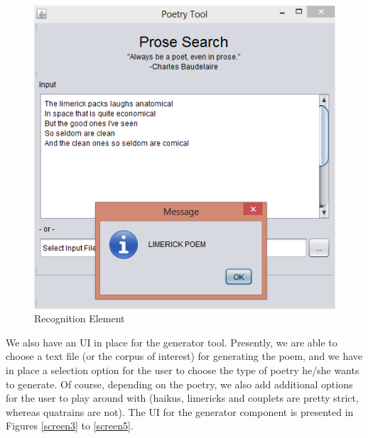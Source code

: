 \documentclass[10pt, letter]{article}
\begin{document}
\begin{figure}[ht]
  \centering
    \includegraphics[scale=0.5]{Images/screen2}
    \caption{Recognition Element}
  \label{screen2}
\end{figure}

We also have an UI in place for the generator tool. Presently, we are able to choose a text file (or the corpus of interest) for generating the poem, and we have in place a selection option for the user to choose the type of poetry he/she wants to generate. Of course, depending on the poetry, we also add additional options for the user to play around with (haikus, limericks and couplets are pretty strict, whereas quatrains are not). The UI for the generator component is presented in Figures \ref{screen3} to \ref{screen5}.
\end{document}
